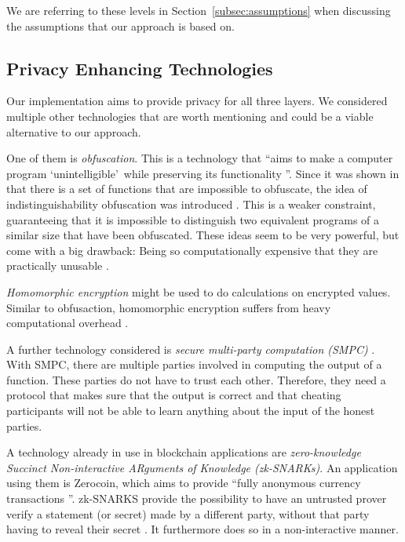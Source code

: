 \documentclass[runningheads]{llncs}
\newcommand{\refsec}[1]{Section~\ref{#1}}
\newcommand{\quotel}{``}
\newcommand{\quoter}{''}
\begin{document}
We are referring to these levels in \refsec{subsec:assumptions} when discussing the assumptions that our approach is based on.






\subsection{Privacy Enhancing Technologies} \label{subsec:technologies}

Our implementation aims to provide privacy for all three layers. We considered multiple other technologies that are  worth mentioning and could be a viable alternative to our approach. 

One of them is \textit{obfuscation}. This is a technology that \quotel aims to make a computer program `unintelligible'\ while preserving its functionality \quoter \cite{garg2016candidate}. Since it was shown in that there is a set of functions that are impossible to obfuscate, the idea of indistinguishability obfuscation  was introduced \cite{barak2001possibility,barak2012possibility}. This is a weaker constraint, guaranteeing that it is impossible to distinguish two equivalent programs of a similar size that have been obfuscated. These ideas seem to be very powerful, but come with a big drawback: Being so computationally expensive that they are practically unusable \cite{banescu2015idea}.

\textit{Homomorphic encryption} might be used to do calculations on encrypted values. Similar to obfusaction, homomorphic encryption suffers from heavy computational overhead \cite{gentry2010computing}.


A further technology considered is \textit{secure multi-party computation (SMPC)} \cite{orlandi2011multiparty}. With SMPC, there are multiple parties involved in computing the output of a function. These parties do not have to trust each other. Therefore, they need a protocol that makes sure that the output is correct and that cheating participants will not be able to learn anything about the input of the honest parties. 


A technology already in use in blockchain applications are \textit{zero-knowledge Succinct Non-interactive ARguments of Knowledge (zk-SNARKs)}. An application using them is Zerocoin, which aims to provide  \quotel fully anonymous currency transactions \quoter   \cite{miers2013zerocoin}. zk-SNARKS provide the possibility to have an untrusted prover verify a statement (or secret) made by a different party, without that party having to reveal their secret \cite{ben2013snarks}. It furthermore does so in a non-interactive manner. 
\end{document}
